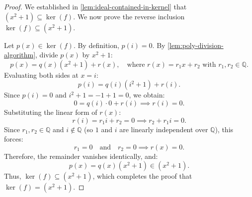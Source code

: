 \begin{content}[Proof that \texorpdfstring{$\ker(f) = (x^2+1)$}{ker(f) = (x^2+1)} and Final Isomorphism]

\begin{proof}
We established in \cref{lem:ideal-contained-in-kernel} that $(x^2 + 1) \subseteq \ker(f)$. We now prove the reverse inclusion $\ker(f) \subseteq (x^2 + 1)$.

Let $p(x) \in \ker(f)$. By definition, $p(i) = 0$. By \cref{lem:poly-division-algorithm}, divide $p(x)$ by $x^2 + 1$:
\[
p(x) = q(x)(x^2 + 1) + r(x), \quad \text{where } r(x) = r_1 x + r_2 \text{ with } r_1, r_2 \in \mathbb{Q}.
\]
Evaluating both sides at $x = i$:
\[
p(i) = q(i)(i^2 + 1) + r(i).
\]
Since $p(i) = 0$ and $i^2 + 1 = -1 + 1 = 0$, we obtain:
\[
0 = q(i) \cdot 0 + r(i) \implies r(i) = 0.
\]
Substituting the linear form of $r(x)$:
\[
r(i) = r_1 i + r_2 = 0 \implies r_2 + r_1 i = 0.
\]
Since $r_1, r_2 \in \mathbb{Q}$ and $i \notin \mathbb{Q}$ (so $1$ and $i$ are linearly independent over $\mathbb{Q}$), this forces:
\[
r_1 = 0 \quad \text{and} \quad r_2 = 0 \implies r(x) = 0.
\]
Therefore, the remainder vanishes identically, and:
\[
p(x) = q(x)(x^2 + 1) \in (x^2 + 1).
\]
Thus, $\ker(f) \subseteq (x^2 + 1)$, which completes the proof that $\ker(f) = (x^2 + 1)$.
\end{proof}

\end{content}

